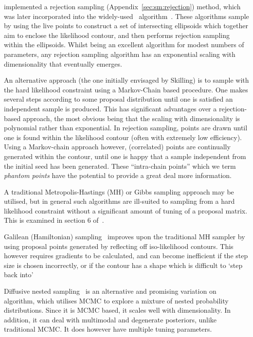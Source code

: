 \cite{Mukherjee} implemented a rejection sampling (Appendix~\ref{sec:sm:rejection}) method, which was later incorporated into the widely-used~\MultiNest{} algorithm~\citep{MultiNest1,MultiNest2,MultiNest3}.
These algorithms sample by using the live points to construct a set of intersecting ellipsoids which together aim to enclose the likelihood contour, and then performs rejection sampling within the ellipsoids.
 Whilst being an excellent algorithm for modest numbers of parameters, any rejection sampling algorithm has an exponential scaling with dimensionality that eventually emerges.

An alternative approach (the one initially envisaged by Skilling) is to sample with the hard likelihood constraint using a Markov-Chain based procedure. One makes several steps according to some proposal distribution until one is satisfied an independent sample is produced. This has significant advantages over a rejection-based approach, the most obvious being that the scaling with dimensionality is polynomial rather than exponential. In rejection sampling, points are drawn until one is found within the likelihood contour (often with extremely low efficiency). Using a Markov-chain approach however, (correlated) points are continually generated within the contour, until one is happy that a sample independent from the initial seed has been generated. These ``intra-chain points'' which we term {\em phantom points\/} have the potential to provide a great deal more information.

A traditional Metropolis-Hastings (MH) or Gibbs sampling approach may be utilised, but in general such algorithms are ill-suited to sampling from a hard likelihood constraint without a significant amount of tuning of a proposal matrix. This is examined in section 6 of~\cite{MultiNest1}.

Galilean (Hamiltonian) sampling~\citep{GalileanNestedSampling,Betancourt2011} improves upon the traditional MH sampler by using proposal points generated by reflecting off iso-likelihood contours. This however requires gradients to be calculated, and can become inefficient if the step size is chosen incorrectly, or if the contour has a shape which is difficult to `step back into'

Diffusive nested sampling~\citep{DiffusiveNestedSampling} is an alternative and promising variation on~ algorithm, which utilises MCMC to explore a mixture of nested probability distributions. Since it is MCMC based, it scales well with dimensionality. In addition, it can deal with multimodal and degenerate posteriors, unlike traditional MCMC\@. It does however have multiple tuning parameters.


